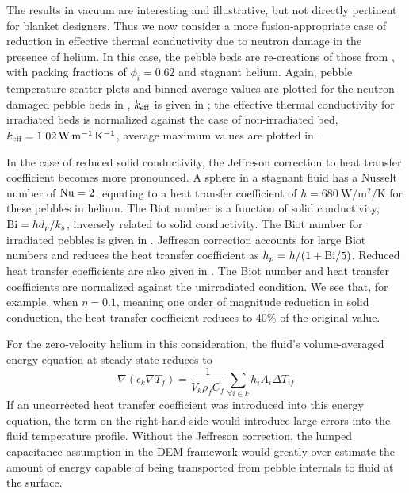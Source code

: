 The results in vacuum are interesting and illustrative, but not directly pertinent for blanket designers. Thus we now consider a more fusion-appropriate case of reduction in effective thermal conductivity due to neutron damage in the presence of helium. In this case, the pebble beds are re-creations of those from , with packing fractions of $\phi_i = 0.62$ and stagnant helium. Again, pebble temperature scatter plots and binned average values are plotted for the neutron-damaged pebble beds in , $k_\text{eff}$ is given in ; the effective thermal conductivity for irradiated beds is normalized against the case of non-irradiated bed, $k_\text{eff} = \SI{1.02}{\watt\per\meter\per\kelvin}$, average maximum values are plotted in .

In the case of reduced solid conductivity, the Jeffreson correction to heat transfer coefficient becomes more pronounced. A sphere in a stagnant fluid has a Nusselt number of $\mathrm{Nu} = 2$, equating to a heat transfer coefficient of $h =\SI{680}{\watt\per\meter\squared\per\kelvin}$ for these pebbles in helium. The Biot number is a function of solid conductivity, $\mathrm{Bi} = hd_p/k_s$, inversely related to solid conductivity. The Biot number for irradiated pebbles is given in . Jeffreson correction accounts for large Biot numbers and reduces the heat transfer coefficient as $h_p = h/(1 + \mathrm{Bi}/5)$. Reduced heat transfer coefficients are also given in . The Biot number and heat transfer coefficients are normalized against the unirradiated condition. We see that, for example, when $\eta = 0.1$, meaning one order of magnitude reduction in solid conduction, the heat transfer coefficient reduces to 40\% of the original value. 

For the zero-velocity helium in this consideration, the fluid's volume-averaged energy equation at steady-state reduces to 
\begin{equation}
\nabla\left(\epsilon_k\nabla T_f\right) = \frac{1}{V_k\rho_fC_f}\sum_{\forall i \in k} h_i A_i \Delta T_{if}
\end{equation}
If an uncorrected heat transfer coefficient was introduced into this energy equation, the term on the right-hand-side would introduce large errors into the fluid temperature profile. Without the Jeffreson correction, the lumped capacitance assumption in the DEM framework would greatly over-estimate the amount of energy capable of being transported from pebble internals to fluid at the surface.

